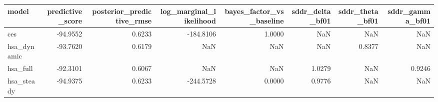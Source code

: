 \begin{tabular}{lrrrrrrr}
\toprule
model & predictive\_score & posterior\_predictive\_rmse & log\_marginal\_likelihood & bayes\_factor\_vs\_baseline & sddr\_delta\_bf01 & sddr\_theta\_bf01 & sddr\_gamma\_bf01 \\
\midrule
ces & -94.9552 & 0.6233 & -184.8106 & 1.0000 & NaN & NaN & NaN \\
hsa\_dynamic & -93.7620 & 0.6179 & NaN & NaN & NaN & 0.8377 & NaN \\
hsa\_full & -92.3101 & 0.6067 & NaN & NaN & 1.0279 & NaN & 0.9246 \\
hsa\_steady & -94.9375 & 0.6233 & -244.5728 & 0.0000 & 0.9776 & NaN & NaN \\
\bottomrule
\end{tabular}
